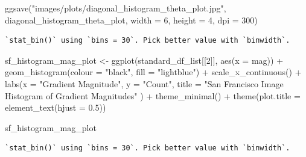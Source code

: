 \documentclass[
  letterpaper,
]{report}
\newenvironment{Shaded}{\begin{snugshade}}{\end{snugshade}}
\newcommand{\AttributeTok}[1]{\textcolor[rgb]{0.40,0.45,0.13}{#1}}
\newcommand{\DecValTok}[1]{\textcolor[rgb]{0.68,0.00,0.00}{#1}}
\newcommand{\FloatTok}[1]{\textcolor[rgb]{0.68,0.00,0.00}{#1}}
\newcommand{\FunctionTok}[1]{\textcolor[rgb]{0.28,0.35,0.67}{#1}}
\newcommand{\NormalTok}[1]{\textcolor[rgb]{0.00,0.23,0.31}{#1}}
\newcommand{\OtherTok}[1]{\textcolor[rgb]{0.00,0.23,0.31}{#1}}
\newcommand{\SpecialCharTok}[1]{\textcolor[rgb]{0.37,0.37,0.37}{#1}}
\newcommand{\StringTok}[1]{\textcolor[rgb]{0.13,0.47,0.30}{#1}}
\begin{document}
\begin{Shaded}
\begin{Highlighting}[]
\FunctionTok{ggsave}\NormalTok{(}\StringTok{"images/plots/diagonal\_histogram\_theta\_plot.jpg"}\NormalTok{, diagonal\_histogram\_theta\_plot, }\AttributeTok{width =} \DecValTok{6}\NormalTok{, }\AttributeTok{height =} \DecValTok{4}\NormalTok{, }\AttributeTok{dpi =} \DecValTok{300}\NormalTok{)}
\end{Highlighting}
\end{Shaded}

\begin{verbatim}
`stat_bin()` using `bins = 30`. Pick better value with `binwidth`.
\end{verbatim}

\begin{Shaded}
\begin{Highlighting}[]
\NormalTok{sf\_histogram\_mag\_plot }\OtherTok{\textless{}{-}}
  \FunctionTok{ggplot}\NormalTok{(standard\_df\_list[[}\DecValTok{2}\NormalTok{]], }
         \FunctionTok{aes}\NormalTok{(}\AttributeTok{x =}\NormalTok{ mag)) }\SpecialCharTok{+}
  \FunctionTok{geom\_histogram}\NormalTok{(}\AttributeTok{colour =} \StringTok{"black"}\NormalTok{, }\AttributeTok{fill =} \StringTok{"lightblue"}\NormalTok{) }\SpecialCharTok{+}
  \FunctionTok{scale\_x\_continuous}\NormalTok{() }\SpecialCharTok{+} 
  \FunctionTok{labs}\NormalTok{(}\AttributeTok{x =} \StringTok{"Gradient Magnitude"}\NormalTok{, }
       \AttributeTok{y =} \StringTok{"Count"}\NormalTok{, }
       \AttributeTok{title =} \StringTok{"San Francisco Image Histogram of Gradient Magnitudes"}
\NormalTok{       ) }\SpecialCharTok{+}
  \FunctionTok{theme\_minimal}\NormalTok{() }\SpecialCharTok{+}
  \FunctionTok{theme}\NormalTok{(}\AttributeTok{plot.title =} \FunctionTok{element\_text}\NormalTok{(}\AttributeTok{hjust =} \FloatTok{0.5}\NormalTok{))}

\NormalTok{sf\_histogram\_mag\_plot}
\end{Highlighting}
\end{Shaded}

\begin{verbatim}
`stat_bin()` using `bins = 30`. Pick better value with `binwidth`.
\end{verbatim}
\end{document}
